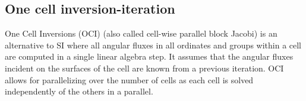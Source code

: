 


\subsection{One cell inversion-iteration}


One Cell Inversions (OCI) (also called cell-wise parallel block Jacobi) is an alternative to SI where all angular fluxes in all ordinates and groups within a cell are computed in a single linear algebra step.
It assumes that the angular fluxes incident on the surfaces of the cell are known from a previous iteration.
OCI allows for parallelizing over the number of cells as each cell is solved independently of the others in a parallel.

